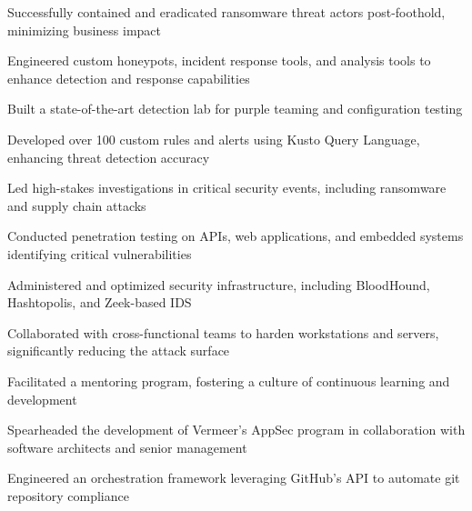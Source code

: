 \item Successfully contained and eradicated ransomware threat actors post-foothold, minimizing business impact
\item Engineered custom honeypots, incident response tools, and analysis tools to enhance detection and response capabilities
\item Built a state-of-the-art detection lab for purple teaming and configuration testing
\item Developed over 100 custom rules and alerts using Kusto Query Language, enhancing threat detection accuracy
\item Led high-stakes investigations in critical security events, including ransomware and supply chain attacks
\item Conducted penetration testing on APIs, web applications, and embedded systems identifying critical vulnerabilities
\item Administered and optimized security infrastructure, including BloodHound, Hashtopolis, and Zeek-based IDS
\item Collaborated with cross-functional teams to harden workstations and servers, significantly reducing the attack surface
\item Facilitated a mentoring program, fostering a culture of continuous learning and development
\item Spearheaded the development of Vermeer's AppSec program in collaboration with software architects and senior management
\item Engineered an orchestration framework leveraging GitHub's API to automate git repository compliance
